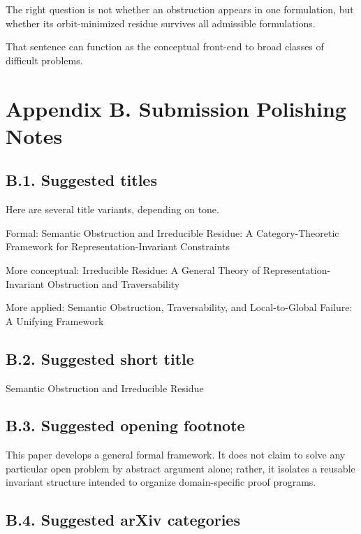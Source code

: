 \documentclass[
]{article}
\begin{document}
The right question is not whether an obstruction appears in one
formulation, but whether its orbit-minimized residue survives all
admissible formulations.

That sentence can function as the conceptual front-end to broad classes
of difficult problems.

\section{Appendix B. Submission Polishing
Notes}\label{appendix-b.-submission-polishing-notes}

\subsection{B.1. Suggested titles}\label{b.1.-suggested-titles}

Here are several title variants, depending on tone.

Formal: Semantic Obstruction and Irreducible Residue: A
Category-Theoretic Framework for Representation-Invariant Constraints

More conceptual: Irreducible Residue: A General Theory of
Representation-Invariant Obstruction and Traversability

More applied: Semantic Obstruction, Traversability, and Local-to-Global
Failure: A Unifying Framework

\subsection{B.2. Suggested short
title}\label{b.2.-suggested-short-title}

Semantic Obstruction and Irreducible Residue

\subsection{B.3. Suggested opening
footnote}\label{b.3.-suggested-opening-footnote}

This paper develops a general formal framework. It does not claim to
solve any particular open problem by abstract argument alone; rather, it
isolates a reusable invariant structure intended to organize
domain-specific proof programs.

\subsection{B.4. Suggested arXiv
categories}\label{b.4.-suggested-arxiv-categories}
\end{document}

